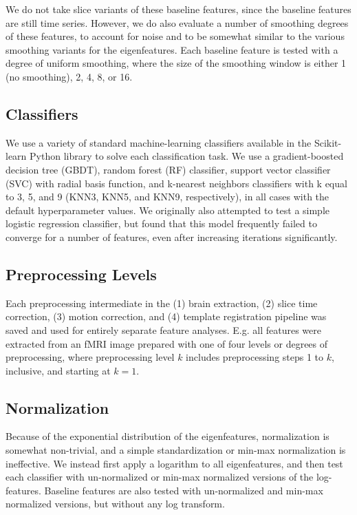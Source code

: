 \documentclass[12pt]{spieman}  %
\begin{document}
\begin{spacing}{2}
We do not take slice variants of these baseline features, since the baseline
features are still time series. However, we do also evaluate a number of
smoothing degrees of these features, to account for noise and to be somewhat
similar to the various smoothing variants for the eigenfeatures. Each baseline
feature is tested with a degree of uniform smoothing, where the size of the
smoothing window is either 1 (no smoothing), 2, 4, 8, or 16.


\subsection{Classifiers}

We use a variety of standard machine-learning classifiers available in the
Scikit-learn\cite{pedregosaScikitlearnMachineLearning2011} Python library to
solve each classification task. We use a gradient-boosted decision tree (GBDT),
random forest (RF) classifier, support vector classifier (SVC) with radial
basis function, and k-nearest neighbors classifiers with k equal to 3, 5, and 9
(KNN3, KNN5, and KNN9, respectively), in all cases with the default
hyperparameter values. We originally also attempted to test a simple logistic
regression classifier, but found that this model frequently failed to converge
for a number of features, even after increasing iterations significantly.


\subsection{Preprocessing Levels}

Each preprocessing intermediate in the (1) brain extraction, (2) slice time
correction, (3) motion correction, and (4) template registration pipeline was
saved and used for entirely separate feature analyses. E.g. all features were
extracted from an fMRI image prepared with one of four levels or degrees of
preprocessing, where preprocessing level \(k\) includes preprocessing steps 1
to \(k\), inclusive, and starting at \(k = 1\).


\subsection{Normalization}

Because of the exponential distribution of the eigenfeatures, normalization is
somewhat non-trivial, and a simple standardization or min-max normalization is
ineffective. We instead first apply a logarithm to all eigenfeatures, and then
test each classifier with un-normalized or min-max normalized versions of the
log-features. Baseline features are also tested with un-normalized and min-max
normalized versions, but without any log transform.



\end{spacing}
\end{document}
